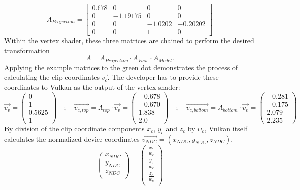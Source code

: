 \begin{equation*}
    A_{Projection} =
\begin{bmatrix}
    0.678 & 0 & 0 & 0 \\
    0 & -1.19175 & 0 & 0 \\
    0 & 0 & -1.0202 & -0.20202 \\
    0 & 0 & 1 & 0
\end{bmatrix}
\end{equation*}
Within the vertex shader, these three matrices are chained to perform the desired transformation
\begin{equation*}
    A = A_{Projection} \cdot A_{View} \cdot A_{Model}.
\end{equation*}
Applying the example matrices to the green dot demonstrates the process of calculating the clip coordinates $\vec{v_{c}}$. The developer has to provide these coordinates to Vulkan as the output of the vertex shader:
\begin{equation*}
    \vec{v_{v}} =     
    \begin{pmatrix}
        0 \\
        1 \\
        0.5625 \\
        1
    \end{pmatrix} \quad ; \quad
    \vec{v_{c, top}} = A_{top} \cdot  \vec{v_{v}} =     
    \begin{pmatrix}
        -0.678 \\
        -0.670 \\
        1.838 \\
        2.0
    \end{pmatrix}
    \quad ; \quad
    \vec{v_{c, bottom}} = A_{bottom} \cdot  \vec{v_{v}} =     
    \begin{pmatrix}
        -0.281 \\
        -0.175 \\
        2.079 \\
        2.235
    \end{pmatrix}
\end{equation*}
By division of the clip coordinate components $x_{c}$, $y_{c}$ and $z_{c}$ by $w_{c}$, Vulkan itself calculates the normalized device coordinates $\vec{v_{NDC}} = (x_{NDC}, y_{NDC}, z_{NDC})$.
\begin{equation*}
    \begin{pmatrix}
        x_{NDC} \\
        y_{NDC} \\
        z_{NDC} \\
    \end{pmatrix}
    =
    \begin{pmatrix}
        \frac{x_{c}}{w_{c}} \\
        \frac{y_{c}}{w_{c}} \\
        \frac{z_{c}}{w_{c}} \\
    \end{pmatrix}
\end{equation*}

